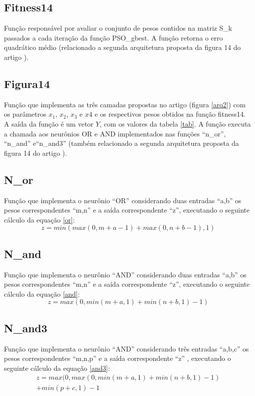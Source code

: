 \documentclass{IEEEtran}
\begin{document}
\subsection{Fitness14}
Função responsável por avaliar o conjunto de pesos contidos na matriz S\_k passados a cada iteração da função PSO\_gbest. A função retorna o erro quadrático médio (relacionado a segunda arquitetura proposta da figura 14 do artigo \cite{pedrycz2006or}). 
\subsection{Figura14}
Função que implementa as três camadas propostas no artigo (figura \ref{arq2}) com os parâmetros $x_1$, $x_2$, $x_3$ e $x4$ e os respectivos pesos obtidos na função fitness14. A saída da função é um vetor $Y$, com os valores da tabela \ref{tab}. A função executa a chamada aos neurônios OR e AND implementados nas funções ``n\_or'', ``n\_and'' e``n\_and3'' (também relacionado a segunda arquitetura proposta da figura 14 do artigo \cite{pedrycz2006or}).
\subsection{N\_or}
Função que implementa o neurônio ``OR'' considerando duas entradas ``a,b'' os pesos correspondentes  ``m,n'' e a saída correspondente ``z'', executando o seguinte cálculo da equação \ref{or}: 
\begin{equation} \label{or}
  z = min(max(0, m+a - 1) + max(0, n+b - 1), 1)
\end{equation}
\subsection{N\_and}
Função que implementa o neurônio ``AND'' considerando duas entradas ``a,b'' os pesos correspondentes  ``m,n'' e a saída correspondente ``z'', executando o seguinte cálculo da equação \ref{and}: 
\begin{equation} \label{and}
  z = max(0, min(m+a,1) + min(n+b,1) - 1)
\end{equation}
\subsection{N\_and3}
Função que implementa o neurônio ``AND'' considerando três entradas ``a,b,c'' os pesos correspondentes  ``m,n,p'' e a saída correspondente ``z'' , executando o seguinte cálculo da equação \ref{and3}: 
\begin{equation} \label{and3}
\begin{split}
  z = max(0, max(0, min(m+a,1) + min(n+b,1) - 1)\\
	+ min(p+c,1) - 1
\end{split}
\end{equation}
\end{document}
